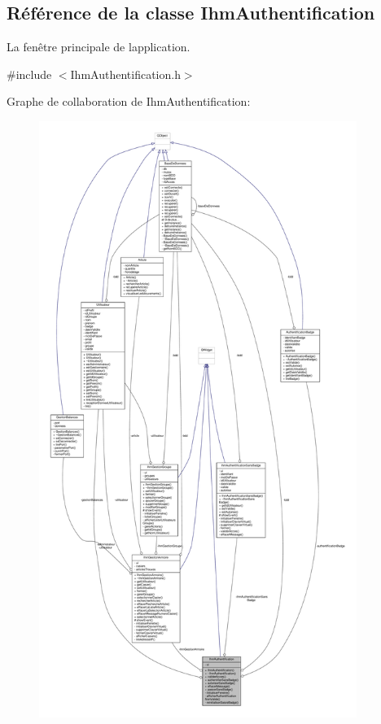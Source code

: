 \hypertarget{class_ihm_authentification}{}\subsection{Référence de la classe Ihm\+Authentification}
\label{class_ihm_authentification}


La fenêtre principale de l\textquotesingle{}application.  




{\ttfamily \#include $<$Ihm\+Authentification.\+h$>$}



Graphe de collaboration de Ihm\+Authentification\+:\nopagebreak
\begin{figure}[H]
\begin{center}
\leavevmode
\includegraphics[height=550pt]{class_ihm_authentification__coll__graph}
\end{center}
\end{figure}

